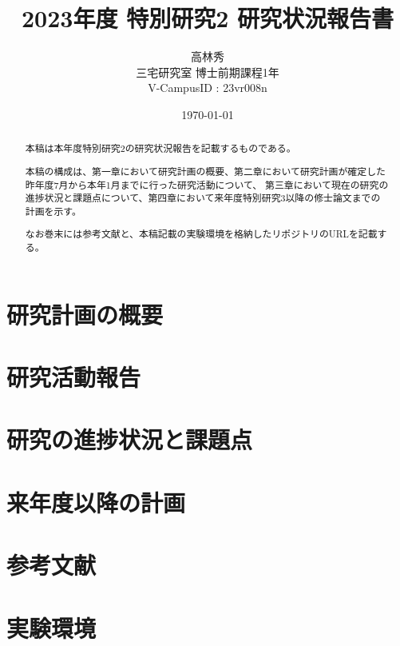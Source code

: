 \documentclass{article}[jsarticle]
\title{2023年度 特別研究2 研究状況報告書}
\author{高林秀 \\ 三宅研究室 博士前期課程1年 \\ V-CampusID : 23vr008n}
\date{\today}
\begin{document}
\maketitle

\begin{abstract}
    本稿は本年度特別研究2の研究状況報告を記載するものである。\par
    本稿の構成は、第一章において研究計画の概要、第二章において研究計画が確定した昨年度7月から本年1月までに行った研究活動について、
    第三章において現在の研究の進捗状況と課題点について、第四章において来年度特別研究3以降の修士論文までの計画を示す。\par 
    なお巻末には参考文献と、本稿記載の実験環境を格納したリポジトリのURLを記載する。
\end{abstract}



\tableofcontents


\section{研究計画の概要}
\section{研究活動報告}
\section{研究の進捗状況と課題点}
\section{来年度以降の計画}
\section{参考文献}
\section{実験環境}
\end{document}
